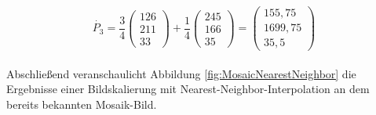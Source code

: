 \documentclass[
fontsize=10pt, 
listof = totoc,
parskip = half	
]{report}
\begin{document}
\begin{equation}
	\dot{P_3} =
	\frac{3}{4}
	\begin{pmatrix}
		126\\
		211\\
		33
	\end{pmatrix}
	+
	\frac{1}{4}
	\begin{pmatrix}
		245\\
		166\\
		35
	\end{pmatrix}
	=
	\begin{pmatrix}
		155,75\\
		1699,75\\
		35,5
	\end{pmatrix}
\end{equation} 
\\
Abschließend veranschaulicht Abbildung \ref{fig:MosaicNearestNeighbor} die Ergebnisse einer Bildskalierung mit Nearest-Neighbor-Interpolation an dem bereits bekannten Mosaik-Bild.
\\
\end{document}
